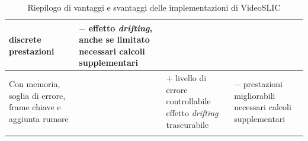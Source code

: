 \documentclass[12pt,a4paper,oneside]{article}
\begin{document}
\begin{longtable}[!htb]{|>{\centering\arraybackslash}m{}||>{\centering\arraybackslash}m{}|>{\raggedright\arraybackslash}m{}|>{\raggedright\arraybackslash}m{}|}
	\newline{\textcolor{blue}{$+$}} discrete prestazioni &
	{\textcolor{red}{$-$}} effetto \textit{drifting}, anche se limitato
	\newline{\textcolor{red}{$-$}} necessari calcoli supplementari\\\hline
	Con memoria, soglia di errore, frame chiave e aggiunta rumore       & \Cref{EDSH_videos_key_frames_noise} & {\textcolor{blue}{$+$}} livello di errore controllabile
	\newline{\textcolor{blue}{$+$}} effetto \textit{drifting} trascurabile &
	{\textcolor{red}{$-$}} prestazioni migliorabili
	\newline{\textcolor{red}{$-$}} necessari calcoli supplementari\\\hline
	
	\captionsetup{justification=centering}
	\caption{Riepilogo di vantaggi e svantaggi delle implementazioni di VideoSLIC}
	\label{EDSH_videos_conclusion}
\end{longtable}
\endgroup
\end{document}
